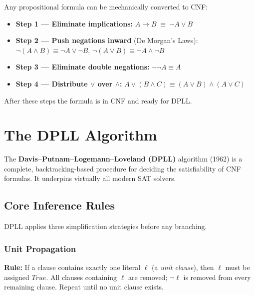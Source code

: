 \documentclass[11pt, a4paper]{article}
\begin{document}
Any propositional formula can be mechanically converted to CNF:

\begin{itemize}
  \item \textbf{Step 1 — Eliminate implications:}
        $A \to B \;\equiv\; \lnot A \lor B$
  \item \textbf{Step 2 — Push negations inward} (De Morgan's Laws):
        $\lnot(A \land B) \equiv \lnot A \lor \lnot B$, \quad
        $\lnot(A \lor B) \equiv \lnot A \land \lnot B$
  \item \textbf{Step 3 — Eliminate double negations:}
        $\lnot\lnot A \equiv A$
  \item \textbf{Step 4 — Distribute $\lor$ over $\land$:}
        $A \lor (B \land C) \equiv (A \lor B) \land (A \lor C)$
\end{itemize}

After these steps the formula is in CNF and ready for DPLL.

\section{The DPLL Algorithm}

The \textbf{Davis–Putnam–Logemann–Loveland (DPLL)} algorithm (1962) is a
complete, backtracking-based procedure for deciding the satisfiability of
CNF formulas.  It underpins virtually all modern SAT solvers.

\subsection{Core Inference Rules}

DPLL applies three simplification strategies before any branching.

\subsubsection{Unit Propagation}

\begin{tcolorbox}[infostyle]
\textbf{Rule:} If a clause contains exactly one literal $\ell$
(a \emph{unit clause}), then $\ell$ must be assigned $\textit{True}$.
All clauses containing $\ell$ are removed; $\lnot\ell$ is removed from every
remaining clause.  Repeat until no unit clause exists.
\end{tcolorbox}
\end{document}
